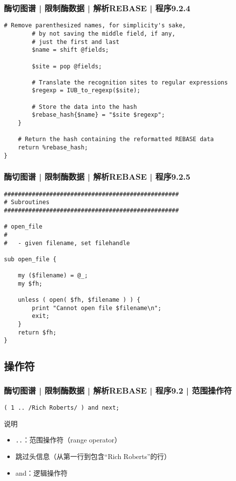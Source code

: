 \begin{frame}[fragile]
  \frametitle{酶切图谱 | 限制酶数据 | 解析REBASE | 程序9.2.4}
  \vspace{-0.8em}
\begin{lstlisting}[firstnumber=39,basicstyle=\footnotesize\tt,numberstyle=\scriptsize]
        # Remove parenthesized names, for simplicity's sake,
        # by not saving the middle field, if any,
        # just the first and last
        $name = shift @fields;

        $site = pop @fields;

        # Translate the recognition sites to regular expressions
        $regexp = IUB_to_regexp($site);

        # Store the data into the hash
        $rebase_hash{$name} = "$site $regexp";
    }

    # Return the hash containing the reformatted REBASE data
    return %rebase_hash;
}
\end{lstlisting}
\end{frame}

\begin{frame}[fragile]
  \frametitle{酶切图谱 | 限制酶数据 | 解析REBASE | 程序9.2.5}
\begin{lstlisting}[firstnumber=57,basicstyle=\footnotesize\tt,numberstyle=\scriptsize]
##################################################
# Subroutines
##################################################

# open_file
#
#   - given filename, set filehandle

sub open_file {

    my ($filename) = @_;
    my $fh;

    unless ( open( $fh, $filename ) ) {
        print "Cannot open file $filename\n";
        exit;
    }
    return $fh;
}
\end{lstlisting}
\end{frame}

\subsection{操作符}
\begin{frame}[fragile]
  \frametitle{酶切图谱 | 限制酶数据 | 解析REBASE | 程序9.2 | \alert{范围操作符}}
\begin{lstlisting}
( 1 .. /Rich Roberts/ ) and next;
\end{lstlisting}
\pause
\begin{block}{说明}
  \begin{itemize}
    \item \verb|..|：范围操作符（range operator）
    \item 跳过头信息（从第一行到包含“Rich Roberts”的行）
    \item and：逻辑操作符
  \end{itemize}
\end{block}
\end{frame}

